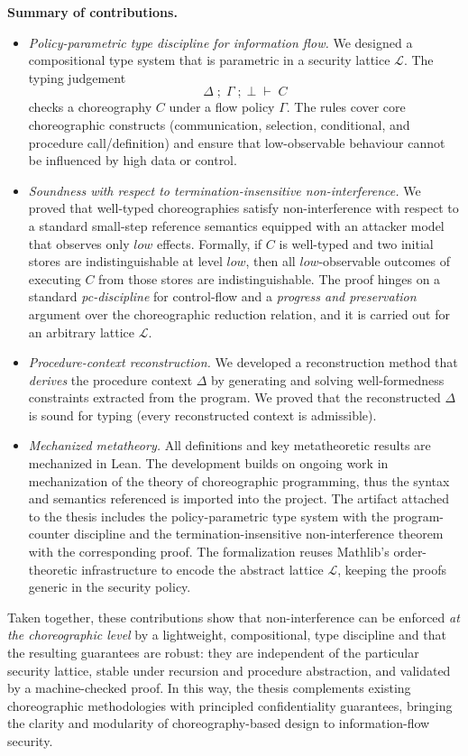 \documentclass[12pt,a4paper,twoside]{book}
\newcommand{\MCL}{\mathscr{L}}
\begin{document}
\medskip
\noindent\textbf{Summary of contributions.}
\begin{itemize}
  \item \emph{Policy-parametric type discipline for information flow.} We designed a compositional type system that is parametric in a security lattice $\MCL$. The typing judgement
  \[
    \Delta \;;\; \Gamma \;;\; \bot \;\vdash\; C
  \]
  checks a choreography $C$ under a flow policy $\Gamma$.
  The rules cover core choreographic constructs (communication, selection, conditional, and procedure call/definition) and ensure that low-observable behaviour cannot be influenced by high data or control.
  \item \emph{Soundness with respect to termination-insensitive non-interference.} We proved that well-typed choreographies satisfy non-interference with respect to a standard small-step reference semantics equipped with an attacker model that observes only $low$ effects. Formally, if $C$ is well-typed and two initial stores are indistinguishable at level $low$, then all $low$-observable outcomes of executing $C$ from those stores are indistinguishable. 
The proof hinges on a standard \emph{pc-discipline} for control-flow and a \emph{progress and preservation} argument over the choreographic reduction relation, and it is carried out for an arbitrary lattice $\MCL$.
  \item \emph{Procedure-context reconstruction.} We developed a reconstruction method that \emph{derives} the procedure context $\Delta$ by generating and solving well-formedness constraints extracted from the program. We proved that the reconstructed $\Delta$ is sound for typing (every reconstructed context is admissible).
  \item \emph{Mechanized metatheory.} All definitions and key metatheoretic results are mechanized in Lean. The development builds on ongoing work in mechanization of the theory of choreographic programming, thus the syntax and semantics referenced is imported into the project. The artifact attached to the thesis includes the policy-parametric type system with the program-counter discipline and the termination-insensitive non-interference theorem with the corresponding proof. The formalization reuses Mathlib's order-theoretic infrastructure to encode the abstract lattice $\MCL$, keeping the proofs generic in the security policy.
\end{itemize}
Taken together, these contributions show that non-interference can be enforced \emph{at the choreographic level} by a lightweight, compositional, type discipline and that the resulting guarantees are robust: they are independent of the particular security lattice, stable under recursion and procedure abstraction, and validated by a machine-checked proof. In this way, the thesis complements existing choreographic methodologies with principled confidentiality guarantees, bringing the clarity and modularity of choreography-based design to information-flow security.
\end{document}
